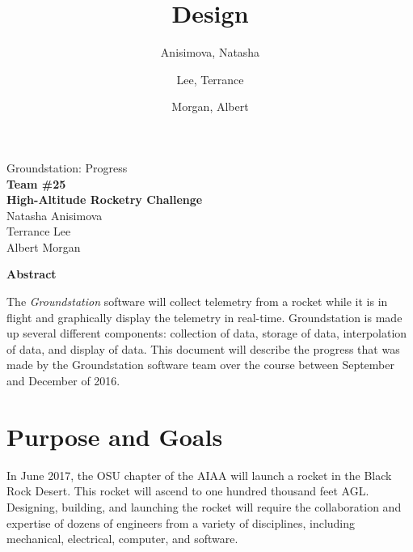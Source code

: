 \documentclass[10pt,draftclsnofoot,onecolumn]{IEEEtran}
\begin{document}
	\singlespace
	
	\title{\vspace{2in}Design}
	
	\author {
		Anisimova, Natasha
		\and
		Lee, Terrance
		\and
		Morgan, Albert
	}
	
	
	\pagestyle{empty}
	\vspace*{2in}
	\begin{center}
		\huge
		Groundstation: Progress\\
		\normalsize
		\vspace{5mm}
		\textbf{
			Team \#25\\
			High-Altitude Rocketry Challenge\\
		}
		\vspace{1mm}
		Natasha Anisimova\\
		Terrance Lee\\
		Albert Morgan
	\end{center}
	
	\vspace{5mm}
	
	\begin{center}
		\textbf{Abstract}
	\end{center}
	
	
	The \textit{Groundstation} software will collect telemetry from a rocket while it is in flight and graphically display the telemetry in real-time. Groundstation is made up several different components: collection of data, storage of data, interpolation of data, and 
	display of data.
	This document will describe the progress that was made by the Groundstation software team over the course between September and December of 2016.
		
	\pagestyle{headings}
	
	\newpage

	\tableofcontents
	\newpage

\section{Purpose and Goals}
	In June 2017, the \ac{OSU} chapter of the
	\ac{AIAA} will launch a rocket in the Black Rock Desert.
	This rocket will ascend to one hundred thousand feet \ac{AGL}.
	Designing, building, and launching the rocket will require the
	collaboration and expertise of dozens of engineers from a variety
	of disciplines, including mechanical, electrical, computer, and
	software.
	
\end{document}
